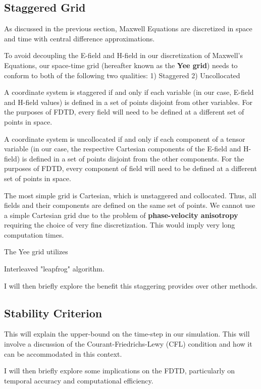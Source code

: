 \documentclass[reprint,preprintnumbers,amsmath,amssymb,aps,nofootinbib,showkeys]{revtex4-2}
\begin{document}
\subsection{Staggered Grid}

     As discussed in the previous section, Maxwell Equations are discretized in space and time with central difference approximations.

    To avoid decoupling the E-field and H-field in our discretization of Maxwell's Equations, our space-time grid (hereafter known as the \textbf{Yee grid}) needs to conform to both of the following two qualities:
        1) Staggered
        2) Uncollocated
    
    A coordinate system is staggered if and only if each variable (in our case, E-field and H-field values) is defined in a set of points disjoint from other variables. For the purposes of FDTD, every field will need to be defined at a different set of points in space.

    A coordinate system is uncollocated if and only if each component of a tensor variable (in our case, the respective Cartesian components of the E-field and H-field) is defined in a set of points disjoint from the other components. For the purposes of FDTD, every component of field will need to be defined at a different set of points in space.

    The most simple grid is Cartesian, which is unstaggered and collocated. Thus, all fields and their components are defined on the same set of points. We cannot use a simple Cartesian grid due to the problem of \textbf{phase-velocity anisotropy} requiring the choice of very fine discretization. This would imply very long computation times.

    The Yee grid utilizes 

    Interleaved "leapfrog" algorithm.

    I will then briefly explore the benefit this staggering provides over other methods.
    
\subsection{Stability Criterion}\label{stability}

    This will explain the upper-bound on the time-step in our simulation. This will involve a discussion of the Courant-Friedrichs-Lewy (CFL) condition and how it can be accommodated in this context.

    I will then briefly explore some implications on the FDTD, particularly on temporal accuracy and computational efficiency.
\end{document}

